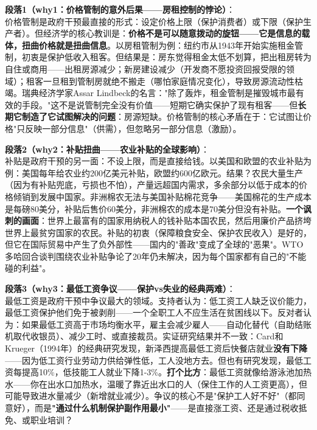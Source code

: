 \documentclass[../main.tex]{subfiles}
\begin{document}
	\textbf{段落1（why1：价格管制的意外后果——房租控制的悖论）}：\\
	价格管制是政府干预最直接的形式：设定价格上限（保护消费者）或下限（保护生产者）。但经济学的核心教训是：\textbf{价格不是可以随意拨动的旋钮——它是信息的载体，扭曲价格就是扭曲信息}。以房租管制为例：纽约市从1943年开始实施租金管制，初衷是保护低收入租客。但结果是：房东觉得租金太低不划算，把出租房转为自住或商用——出租房源减少；新房建设减少（开发商不愿投资回报受限的领域）；租客一旦租到管制房就绝不搬走（哪怕家庭情况变化），导致房源流动性枯竭。瑞典经济学家Assar Lindbeck的名言："除了轰炸，租金管制是摧毁城市最有效的手段。"这不是说管制完全没有价值——短期它确实保护了现有租客——但\textbf{长期它制造了它试图解决的问题}：房源短缺。价格管制的核心矛盾在于：它试图让价格"只反映一部分信息"（供需），但忽略另一部分信息（激励）。

	\textbf{段落2（why2：补贴扭曲——农业补贴的全球影响）}：\\
	补贴是政府干预的另一面：不设上限，而是直接给钱。以美国和欧盟的农业补贴为例：美国每年给农业约200亿美元补贴，欧盟约600亿欧元。结果？农民大量生产（因为有补贴兜底，亏损也不怕），产量远超国内需求，多余部分以低于成本的价格倾销到发展中国家。非洲棉农无法与美国补贴棉花竞争——美国棉花的生产成本是每磅80美分，补贴后售价60美分，非洲棉农的成本是70美分但没有补贴。\textbf{一个讽刺的画面}：世界上最富有的国家用纳税人的钱补贴本国农民，然后用廉价产品挤垮世界上最贫穷国家的农民。补贴的初衷（保障粮食安全、保护农民收入）是好的，但它在国际贸易中产生了负外部性——国内的"善政"变成了全球的"恶果"。WTO多哈回合谈判围绕农业补贴争论了20年仍未解决，因为每个国家都有自己的"不能碰的利益"。

	\textbf{段落3（why3：最低工资争议——保护vs失业的经典两难）}：\\
	最低工资是政府干预中争议最大的领域。支持者认为：低工资工人缺乏议价能力，最低工资保护他们免于被剥削——一个全职工人不应生活在贫困线以下。反对者认为：如果最低工资高于市场均衡水平，雇主会减少雇人——自动化替代（自助结账机取代收银员）、减少工时、或直接裁员。实证研究结果并不一致：Card和Krueger（1994年）的经典研究发现，新泽西提高最低工资后快餐店就业\textbf{没有下降}——因为低工资行业劳动力供给弹性低，工人没地方去。但也有研究发现，最低工资每提高10\%，低技能工人就业下降1-3\%。\textbf{打个比方}：最低工资就像给游泳池加热水——你在出水口加热水，温暖了靠近出水口的人（保住工作的人工资更高），但可能导致进水量减少（新增就业减少）。争议的核心不是"保护工人好不好"（都同意好），而是\textbf{"通过什么机制保护副作用最小"}——是直接涨工资、还是通过税收抵免、或职业培训？
\end{document}
